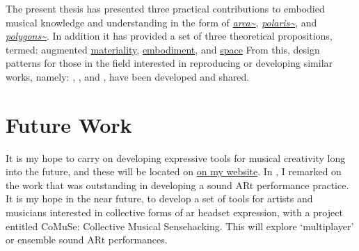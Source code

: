The present thesis has presented three practical contributions to embodied musical knowledge and understanding in the form of \textit{\hyperref[sec: area]{area\textasciitilde{}}}, \textit{\hyperref[sec: polaris]{polaris\textasciitilde{}}}, and \textit{\hyperref[sec: polygons]{polygons\textasciitilde{}}}. In addition it has provided a set of three theoretical propositions, termed: augmented \hyperref[sec: discussion-medium-material]{materiality}, \hyperref[sec: discussion-medium-embodiment]{embodiment}, and \hyperref[sec: discussion-medium-space]{space} From this, design patterns for those in the field interested in reproducing or developing similar works, namely: \textit{}, \textit{}, and \textit{}, have been developed and shared. 

\section{Future Work}\label{sec: conclusion-futurework}
It is my hope to carry on developing expressive tools for musical creativity long into the future, and these will be located on \href{https://sambilbow.com}{on my website}. In \textit{}, I remarked on the work that was outstanding in developing a sound ARt performance practice. It is my hope in the near future, to develop a set of tools for artists and musicians interested in collective forms of \ac{ar} headset expression, with a project entitled CoMuSe: Collective Musical Sensehacking. This will explore `multiplayer' or ensemble sound ARt performances.
